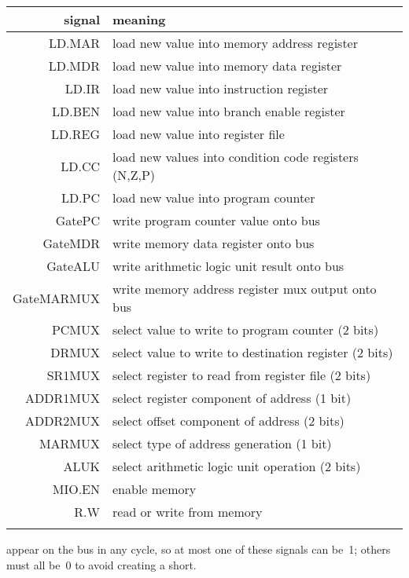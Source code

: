 \begin{minipage}{4.55in}
\begin{tabular}{rl}
signal& meaning\\ \hline
LD.MAR& load new value into memory address register\\
LD.MDR& load new value into memory data register\\
LD.IR& load new value into instruction register\\
LD.BEN& load new value into branch enable register\\
LD.REG& load new value into register file\\
LD.CC& load new values into condition code registers (N,Z,P)\\
LD.PC& load new value into program counter\\ \hline
GatePC& write program counter value onto bus\\
GateMDR& write memory data register onto bus\\
GateALU& write arithmetic logic unit result onto bus\\
GateMARMUX& write memory address register mux output onto bus\\ \hline
PCMUX& select value to write to program counter (2 bits)\\
DRMUX& select value to write to destination register (2 bits)\\
SR1MUX& select register to read from register file (2 bits)\\
ADDR1MUX& select register component of address (1 bit)\\
ADDR2MUX& select offset component of address (2 bits)\\
MARMUX& select type of address generation (1 bit)\\ \hline
ALUK& select arithmetic logic unit operation (2 bits)\\ \hline
MIO.EN& enable memory\\ \hline
R.W& read or write from memory\\ \\
\end{tabular}
\end{minipage}\mpdone

appear on the bus in 
any cycle, so at most one of these signals can be~1; others must all 
be~0 to avoid creating a short.

\pagebreak


\pagebreak

